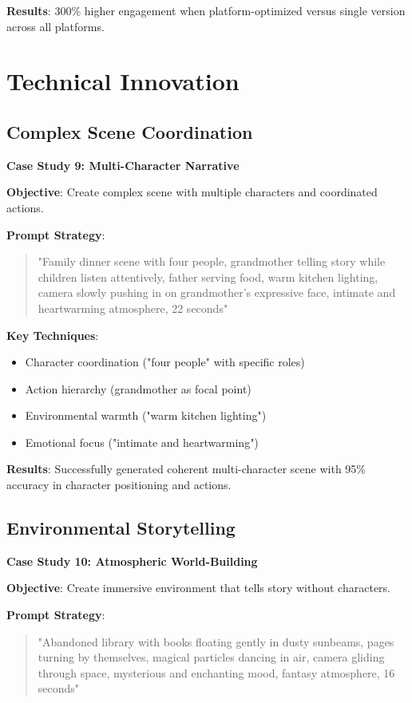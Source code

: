 \textbf{Results}: 300\% higher engagement when platform-optimized versus single version across all platforms.

\section{Technical Innovation}

\subsection{Complex Scene Coordination}
\textbf{Case Study 9: Multi-Character Narrative}

\textbf{Objective}: Create complex scene with multiple characters and coordinated actions.

\textbf{Prompt Strategy}:
\begin{quote}
"Family dinner scene with four people, grandmother telling story while children listen attentively, father serving food, warm kitchen lighting, camera slowly pushing in on grandmother's expressive face, intimate and heartwarming atmosphere, 22 seconds"
\end{quote}

\textbf{Key Techniques}:
\begin{itemize}
\item Character coordination ("four people" with specific roles)
\item Action hierarchy (grandmother as focal point)
\item Environmental warmth ("warm kitchen lighting")
\item Emotional focus ("intimate and heartwarming")
\end{itemize}

\textbf{Results}: Successfully generated coherent multi-character scene with 95\% accuracy in character positioning and actions.

\subsection{Environmental Storytelling}
\textbf{Case Study 10: Atmospheric World-Building}

\textbf{Objective}: Create immersive environment that tells story without characters.

\textbf{Prompt Strategy}:
\begin{quote}
"Abandoned library with books floating gently in dusty sunbeams, pages turning by themselves, magical particles dancing in air, camera gliding through space, mysterious and enchanting mood, fantasy atmosphere, 16 seconds"
\end{quote}

